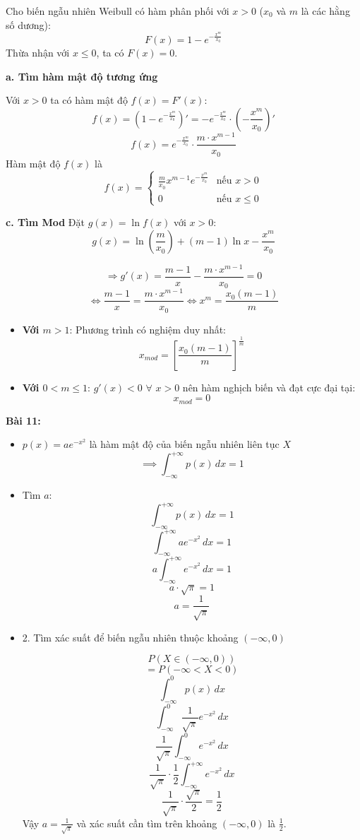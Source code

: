 \documentclass[12pt]{article}
\begin{document}
Cho biến ngẫu nhiên Weibull có hàm phân phối với $x > 0$ ($x_0$ và $m$ là các hằng số dương):
$$F(x) = 1 - e^{-\frac{x^m}{x_0}}$$
Thừa nhận với $x \le 0$, ta có $F(x) = 0$.

\textbf{a. Tìm hàm mật độ tương ứng}

Với $x > 0$ ta có hàm mật độ $f(x) = F'(x)$:
$$f(x) = \left( 1 - e^{-\frac{x^m}{x_0}} \right)' = - e^{-\frac{x^m}{x_0}} \cdot \left( -\frac{x^m}{x_0} \right)'$$
$$f(x) = e^{-\frac{x^m}{x_0}} \cdot \frac{m \cdot x^{m-1}}{x_0}$$
Hàm mật độ $f(x)$ là
$$f(x) = \begin{cases} \frac{m}{x_0} x^{m-1} e^{-\frac{x^m}{x_0}} & \text{nếu } x > 0 \\ 0 & \text{nếu } x \le 0 \end{cases}$$

\textbf{c. Tìm Mod}
Đặt $g(x) = \ln f(x)$ với $x > 0$:
$$g(x) = \ln\left(\frac{m}{x_0}\right) + (m-1)\ln x - \frac{x^m}{x_0}$$

$$\Rightarrow g'(x) = \frac{m-1}{x} - \frac{m \cdot x^{m-1}}{x_0} = 0$$
$$\iff \frac{m-1}{x} = \frac{m \cdot x^{m-1}}{x_0} \iff x^m = \frac{x_0(m-1)}{m}$$


\begin{itemize}
    \item \textbf{Với $m > 1$}: Phương trình có nghiệm duy nhất:
    $$x_{mod} = \left[ \frac{x_0(m-1)}{m} \right]^{\frac{1}{m}}$$
    
    \item \textbf{Với $0 < m \le 1$}: $g'(x) < 0$ $\forall$ $x > 0$ nên hàm nghịch biến và đạt cực đại tại:
    $$x_{mod} = 0$$
\end{itemize}

\textbf{Bài 11:}
\begin{itemize}
\item $p(x) = ae^{-x^2}$ là hàm mật độ của biến ngẫu nhiên liên tục $X$ 
$$\implies \int_{-\infty}^{+\infty} p(x) \, dx = 1 $$

\item  Tìm $a$:\\
$$ \int_{-\infty}^{+\infty} p(x) \, dx = 1 $$
$$ \int_{-\infty}^{+\infty} ae^{-x^2} \, dx = 1 $$ $$ a \int_{-\infty}^{+\infty} e^{-x^2} \, dx = 1 $$
$$ a \cdot \sqrt{\pi} = 1 $$ $$ a = \frac{1}{\sqrt{\pi}} $$

\item 2. Tìm xác suất để biến ngẫu nhiên thuộc khoảng $(-\infty, 0)$

$$ P(X \in (-\infty, 0)) $$ $$= P(-\infty < X < 0) $$ $$ \int_{-\infty}^{0} p(x) \, dx $$ $$ \int_{-\infty}^{0} \frac{1}{\sqrt{\pi}} e^{-x^2} \, dx $$
$$ \frac{1}{\sqrt{\pi}} \int_{-\infty}^{0} e^{-x^2} \, dx $$
$$\frac{1}{\sqrt{\pi}} \cdot \frac{1}{2} \int_{-\infty}^{+\infty} e^{-x^2} \, dx $$ $$ \frac{1}{\sqrt{\pi}} \cdot \frac{\sqrt{\pi}}{2} = \frac{1}{2}$$
Vậy $a = \frac{1}{\sqrt{\pi}}$ và xác suất cần tìm trên khoảng $(-\infty, 0)$ là $\frac{1}{2}$.
\end{itemize}
\end{document}
